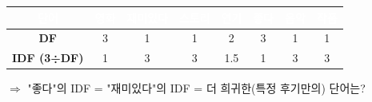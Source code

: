 \documentclass[a4paper,11pt]{article}
\begin{document}
\begin{center}
\renewcommand{\arraystretch}{1.4}
\begin{tabular}{|c|c|c|c|c|c|c|c|}
\hline
\cellcolor{badgegray}\textcolor{white}{\small\bfseries 단어} & \cellcolor{badgegray}\textcolor{white}{\small\bfseries 영화} & \cellcolor{badgegray}\textcolor{white}{\small\bfseries 재미있다} & \cellcolor{badgegray}\textcolor{white}{\small\bfseries 스토리} & \cellcolor{badgegray}\textcolor{white}{\small\bfseries 연기} & \cellcolor{badgegray}\textcolor{white}{\small\bfseries 좋다} & \cellcolor{badgegray}\textcolor{white}{\small\bfseries 음악} & \cellcolor{badgegray}\textcolor{white}{\small\bfseries 작품} \\ \hline
\cellcolor{stepbg}\bfseries DF & \cellcolor{answerbg} 3 & \cellcolor{answerbg} 1 & \cellcolor{answerbg} 1 & \cellcolor{answerbg} 2 & \cellcolor{answerbg} 3 & \cellcolor{answerbg} 1 & \cellcolor{answerbg} 1 \\ \hline
\cellcolor{stepbg}\bfseries IDF
(3÷DF) & \cellcolor{answerbg} 1 & \cellcolor{answerbg} 3 & \cellcolor{answerbg} 3 & \cellcolor{answerbg} 1.5 & \cellcolor{answerbg} 1 & \cellcolor{answerbg} 3 & \cellcolor{answerbg} 3 \\ \hline
\end{tabular}
\end{center}
\noindent\small $\Rightarrow$ "좋다"의 IDF = \hspace{25mm}     "재미있다"의 IDF = \hspace{25mm}     더 희귀한(특정 후기만의) 단어는? \hspace{25mm}
\end{document}
